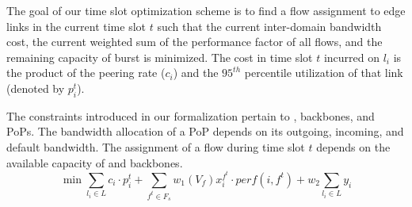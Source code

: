 The goal of our time slot optimization scheme is to find a flow assignment to edge links in the current time slot $t$ such that the current inter-domain bandwidth cost, the current weighted sum of the performance factor of all flows, and the remaining capacity of burst {\egress} is minimized. The cost in time slot $t$ incurred on {\egress} $l_i$ is the product of the peering rate ($c_i$) and the $95^{th}$ percentile utilization of that link (denoted by $p_i^t$). 

 The constraints introduced in our formalization pertain to {\egresses}, backbones, and PoPs. The bandwidth allocation of a PoP depends on its outgoing, incoming, and default bandwidth. The assignment of a flow during time slot $t$ depends on the available capacity of {\egresses} and backbones.
$$\min\sum_{l_i \in L} c_i \cdot p_i^t+\sum_{f^t \in F_s} w_1\left(V_f\right) x_i^{f^t}          \cdot perf(i, f^t) +w_2 \sum_{l_i \in L} y_i $$



